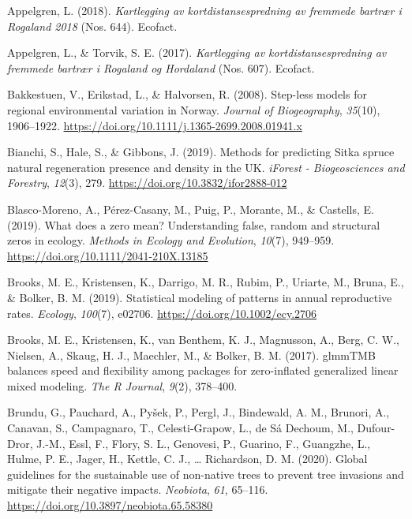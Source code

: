 \documentclass[
]{article}
\begin{document}
\leavevmode\hypertarget{ref-appelgrenKartleggingAvKortdistansespredning2018}{}%
Appelgren, L. (2018). \emph{Kartlegging av kortdistansespredning av fremmede bartrær i Rogaland 2018} (Nos. 644). Ecofact.

\leavevmode\hypertarget{ref-appelgrenKartleggingAvKortdistansespredning2017}{}%
Appelgren, L., \& Torvik, S. E. (2017). \emph{Kartlegging av kortdistansespredning av fremmede bartrær i Rogaland og Hordaland} (Nos. 607). Ecofact.

\leavevmode\hypertarget{ref-bakkestuenSteplessModelsRegional2008}{}%
Bakkestuen, V., Erikstad, L., \& Halvorsen, R. (2008). Step-less models for regional environmental variation in Norway. \emph{Journal of Biogeography}, \emph{35}(10), 1906--1922. \url{https://doi.org/10.1111/j.1365-2699.2008.01941.x}

\leavevmode\hypertarget{ref-bianchiMethodsPredictingSitka2019}{}%
Bianchi, S., Hale, S., \& Gibbons, J. (2019). Methods for predicting Sitka spruce natural regeneration presence and density in the UK. \emph{iForest - Biogeosciences and Forestry}, \emph{12}(3), 279. \url{https://doi.org/10.3832/ifor2888-012}

\leavevmode\hypertarget{ref-blasco-morenoWhatDoesZero2019}{}%
Blasco-Moreno, A., Pérez-Casany, M., Puig, P., Morante, M., \& Castells, E. (2019). What does a zero mean? Understanding false, random and structural zeros in ecology. \emph{Methods in Ecology and Evolution}, \emph{10}(7), 949--959. \url{https://doi.org/10.1111/2041-210X.13185}

\leavevmode\hypertarget{ref-brooksStatisticalModelingPatterns2019}{}%
Brooks, M. E., Kristensen, K., Darrigo, M. R., Rubim, P., Uriarte, M., Bruna, E., \& Bolker, B. M. (2019). Statistical modeling of patterns in annual reproductive rates. \emph{Ecology}, \emph{100}(7), e02706. \url{https://doi.org/10.1002/ecy.2706}

\leavevmode\hypertarget{ref-brooksGlmmTMBBalancesSpeed2017}{}%
Brooks, M. E., Kristensen, K., van Benthem, K. J., Magnusson, A., Berg, C. W., Nielsen, A., Skaug, H. J., Maechler, M., \& Bolker, B. M. (2017). glmmTMB balances speed and flexibility among packages for zero-inflated generalized linear mixed modeling. \emph{The R Journal}, \emph{9}(2), 378--400.

\leavevmode\hypertarget{ref-brunduGlobalGuidelinesSustainable2020}{}%
Brundu, G., Pauchard, A., Pyšek, P., Pergl, J., Bindewald, A. M., Brunori, A., Canavan, S., Campagnaro, T., Celesti-Grapow, L., de Sá Dechoum, M., Dufour-Dror, J.-M., Essl, F., Flory, S. L., Genovesi, P., Guarino, F., Guangzhe, L., Hulme, P. E., Jager, H., Kettle, C. J., \ldots{} Richardson, D. M. (2020). Global guidelines for the sustainable use of non-native trees to prevent tree invasions and mitigate their negative impacts. \emph{Neobiota}, \emph{61}, 65--116. \url{https://doi.org/10.3897/neobiota.65.58380}
\end{document}
